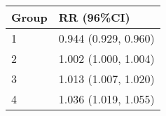\begin{tabular}{ll}
  \hline
Group & RR (96\%CI) \\ 
  \hline
   1 & 0.944 (0.929, 0.960) \\ 
     2 & 1.002 (1.000, 1.004) \\ 
     3 & 1.013 (1.007, 1.020) \\ 
     4 & 1.036 (1.019, 1.055) \\ 
   \hline
\end{tabular}

